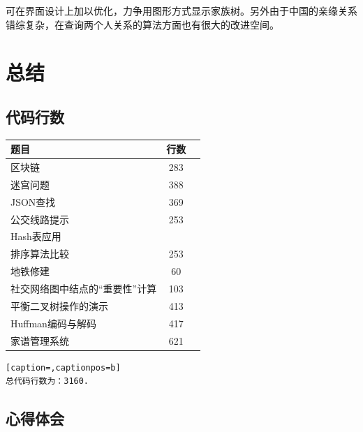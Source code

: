 \documentclass[a4paper,11pt,UTF8]{ctexart}
\begin{document}
可在界面设计上加以优化，力争用图形方式显示家族树。另外由于中国的亲缘关系错综复杂，在查询两个人关系的算法方面也有很大的改进空间。

\section{总结}
\subsection{代码行数}
\begin{table}[htbp]
    \centering
  \begin{tabular*}{0.75\textwidth}{@{\extracolsep{\fill}}lcc}
      \toprule
      题目          &行数         \\
      \midrule
      区块链         &283     \\
      迷宫问题       &388     \\
      JSON查找      &369    \\
      公交线路提示      &253    \\
      Hash表应用      &    \\
      排序算法比较      &253    \\
      地铁修建      &60    \\
      社交网络图中结点的“重要性”计算      &103    \\
      平衡二叉树操作的演示      &413    \\
      Huffman编码与解码      &417    \\
      家谱管理系统      &621    \\
      \bottomrule
  \end{tabular*}
  \end{table}
\begin{lstlisting}[caption=,captionpos=b]
总代码行数为：3160.
\end{lstlisting}
\subsection{心得体会}
\end{document}

